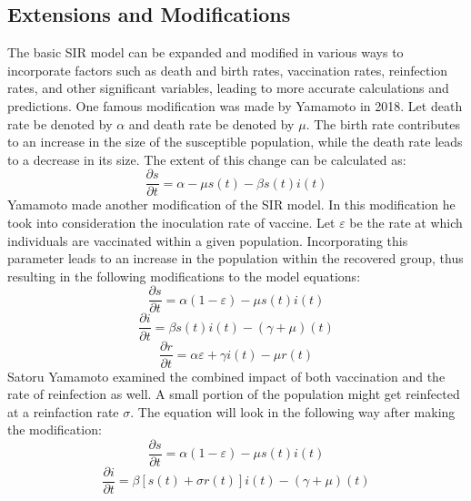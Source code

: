 \subsection{Extensions and Modifications}
\hspace{\parindent}The basic SIR model can be expanded and modified in various ways to incorporate factors such as death and birth rates, vaccination rates, reinfection rates, and other significant variables, leading to more accurate calculations and predictions.
One famous modification was made by Yamamoto in 2018.
Let death rate be denoted by $\alpha$ and death rate be denoted by $\mu$.
The birth rate contributes to an increase in the size of the susceptible population, while the death rate leads to a decrease in its size.
The extent of this change can be calculated as:
\begin{equation*}
    \frac{\partial s}{\partial t} = \alpha - \mu s(t) - \beta s(t)i(t)
\end{equation*}
\hspace{\parindent}Yamamoto made another modification of the SIR model.
In this modification he took into consideration the inoculation rate of vaccine.
Let $\varepsilon$ be the rate at which individuals are vaccinated within a given population.
Incorporating this parameter leads to an increase in the population within the recovered group, thus resulting in the following modifications to the model equations:
\begin{equation*}
    \frac{\partial s}{\partial t} = \alpha(1 - \varepsilon) - \mu s(t)i(t)
\end{equation*}
\begin{equation*}
    \frac{\partial i}{\partial t} = \beta s(t)i(t) - (\gamma + \mu)(t)
\end{equation*}
\begin{equation*}
    \frac{\partial r}{\partial t} = \alpha\varepsilon + \gamma i(t) - \mu r(t)
\end{equation*}
\hspace{\parindent}Satoru Yamamoto examined the combined impact of both vaccination and the rate of reinfection as well.
A small portion of the population might get reinfected at a reinfaction rate $\sigma$.
The equation will look in the following way after making the modification:
\begin{equation*}
    \frac{\partial s}{\partial t} = \alpha(1 - \varepsilon) - \mu s(t)i(t)
\end{equation*}
\begin{equation*}
    \frac{\partial i}{\partial t} = \beta[s(t) + \sigma r(t)]i(t) - (\gamma + \mu)(t)
\end{equation*}
